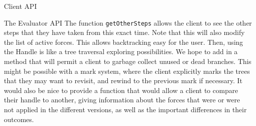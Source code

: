 \documentclass[11pt]{article}
\begin{document}
\begin{section}{Client API}
\begin{subsection}{The Evaluator API}
The function \verb|getOtherSteps| allows the client to see the other steps that they have taken from this exact time. Note that this will also modify the list of active forces. This allows backtracking easy for the user. Then, using the Handle is like a tree traversal exploring  possibilities. We hope to add in a method that will permit a client to garbage collect unused or dead branches. This might be possible with a mark system, where the client explicitly marks the trees that they may want to revisit, and rewind to the previous mark if necessary. It would also be nice to provide a function that would allow a client to compare their handle to another, giving information about the forces that were or were not applied in the different versions, as well as the important differences in their outcomes.\\

\end{subsection}
\end{section}
\end{document}
